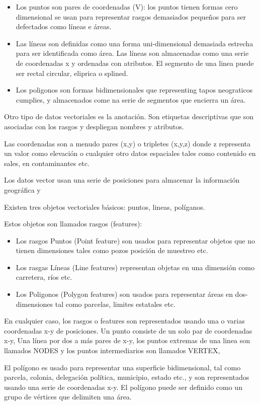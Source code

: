 \begin{itemize}
    \item Los puntos son pares de coordenadas (V): los puntos tienen formas cero dimensional se usan para representar rasgos demasiados pequeños para ser defectados como líneas e áreas.
    \item Las líneas son definidas como una forma uni-dimensional demasiada estrecha para ser identificada como área. Las líneas son almacenadas como una serie de coordenadas x y ordenadas con atributos. El segmento de una linea puede ser rectal circular, eliprica o splined.
    \item Los poligonos son formas bidimensionales que representing tapos neograticos cumplies, y almacenados come na serie de segmentos que encierra un área.    
\end{itemize}
Otro tipo de datos vectoriales es la anotación. Son etiquetas descriptivas que son asociadas con los rasgos y despliegan nombres y atributos.

Las coordenadas son a menudo pares (x,y) o tripletes (x,y,z) donde z representa un valor como elevación o cualquier otro datos espaciales tales como contenido en sales, en contaminantes etc. 

Los datos vector usan una serie de posiciones para almacenar la información geográfica y

Existen tres objetos vectoriales básicos: puntos, lineas, políganos.

Estos objetos son llamados rasgos (features): 

\begin{itemize}
    \item Los rasgos Puntos (Point feature) son usados para representar objetos que no tienen dimensiones tales como pozos posición de muestreo etc.
    \item Los rasgas Líneas (Line features) representan objetas en una dimensión como carretera, ríos etc. 
    \item Los Poligonos (Polygon features) son usados para representar áreas en dos-dimensiones tal como parcelas, limites estatales etc.    
\end{itemize}
En cualquier caso, los rasgos o features son representados usando una o varias coordenadas x-y de posiciones. Un punto consiste de un solo par de coordenadas x-y, Una línea por dos a más pares de x-y, los puntos extremas de una linea son llamados NODES y los puntos intermediarios son llamados VERTEX,

El polígono es usado para representar una superficie bidimensional, tal como parcela, colonia, delegación política, municipio, estado etc., y son representados usando una serie de coordenadas x-y. El polígono puede ser definido como un grupo de vértices que delimiten una área.

